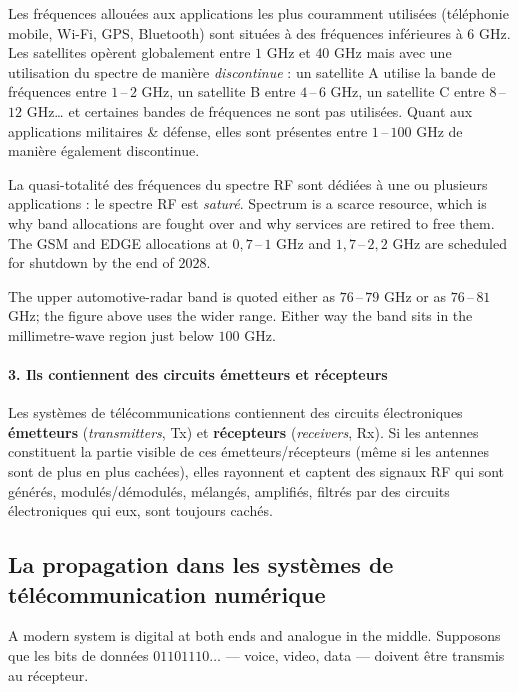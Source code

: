 Les fréquences allouées aux applications les plus couramment utilisées
(téléphonie mobile, Wi-Fi, GPS, Bluetooth) sont situées à des fréquences
inférieures à $6$ GHz. Les satellites opèrent globalement entre $1$ GHz et
$40$ GHz mais avec une utilisation du spectre de manière \textit{discontinue} :
un satellite A utilise la bande de fréquences entre $1$\,--\,$2$ GHz, un
satellite B entre $4$\,--\,$6$ GHz, un satellite C entre $8$\,--\,$12$ GHz… et
certaines bandes de fréquences ne sont pas utilisées. Quant aux applications
militaires \& défense, elles sont présentes entre $1$\,--\,$100$ GHz de manière
également discontinue.

\begin{conclusion}
  La quasi-totalité des fréquences du spectre RF sont dédiées à une ou
  plusieurs applications : le spectre RF est \textit{saturé}. Spectrum is a
  scarce resource, which is why band allocations are fought over and why
  services are retired to free them. The GSM and EDGE allocations at
  $0{,}7$\,--\,$1$ GHz and $1{,}7$\,--\,$2{,}2$ GHz are scheduled for shutdown by
  the end of $2028$.
\end{conclusion}

\begin{remark}
  The upper automotive-radar band is quoted either as $76$\,--\,$79$ GHz or as
  $76$\,--\,$81$ GHz; the figure above uses the wider range. Either way the band
  sits in the millimetre-wave region just below $100$ GHz.
\end{remark}

\paragraph{3. Ils contiennent des circuits émetteurs et récepteurs}
Les systèmes de télécommunications contiennent des circuits électroniques
\textbf{émetteurs} (\textit{transmitters}, Tx) et \textbf{récepteurs}
(\textit{receivers}, Rx). Si les antennes constituent la partie visible de ces
émetteurs/récepteurs (même si les antennes sont de plus en plus cachées), elles
rayonnent et captent des signaux RF qui sont générés, modulés/démodulés,
mélangés, amplifiés, filtrés par des circuits électroniques qui eux, sont
toujours cachés.

\subsection{La propagation dans les systèmes de télécommunication numérique}
A modern system is digital at both ends and analogue in the middle. Supposons
que les bits de données $01101110\ldots$ --- voice, video, data --- doivent être
transmis au récepteur.

